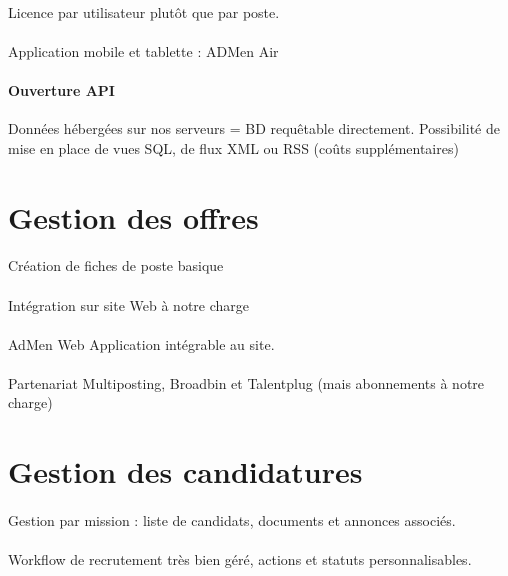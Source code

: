\documentclass[12pt,twoside]{scrreprt}
\begin{document}
\paragraph{} Licence par utilisateur plutôt que par poste.
\paragraph{} Application mobile et tablette  : ADMen Air
\paragraph{Ouverture API} Données hébergées sur nos serveurs = BD requêtable directement. Possibilité de mise en place de vues SQL, de flux XML ou RSS (coûts supplémentaires)

\section{Gestion des offres}
\paragraph{} Création de fiches de poste basique
\paragraph{} Intégration sur site Web à notre charge
\paragraph{} AdMen Web Application intégrable au site.
\paragraph{} Partenariat Multiposting, Broadbin et Talentplug (mais abonnements à notre charge)




\section{Gestion des candidatures} 
\paragraph{} Gestion par mission : liste de candidats, documents et annonces associés.
\paragraph{} Workflow de recrutement très bien géré, actions et statuts personnalisables.
\end{document}
